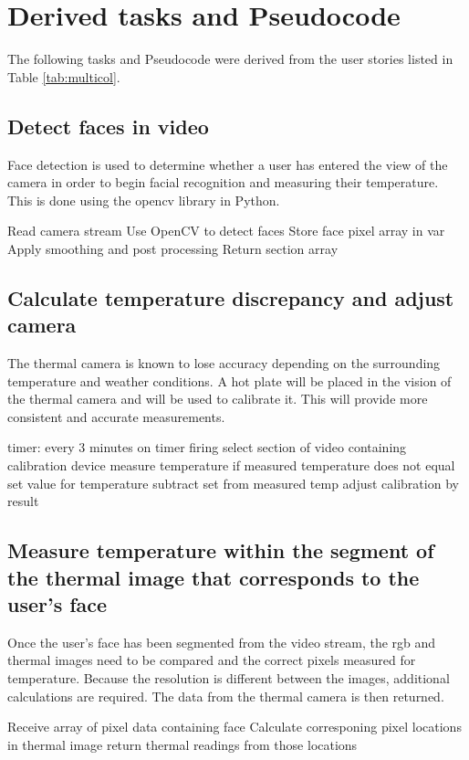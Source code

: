\documentclass[12pt, letterpaper]{article}
\begin{document}
    \section{Derived tasks and Pseudocode}
    The following tasks and Pseudocode were derived from the user stories listed in Table \ref{tab:multicol}.
    \subsection{Detect faces in video}
    Face detection is used to determine whether a user has entered the view of the camera in order to 
    begin facial recognition and measuring their temperature. This is done using the opencv library in 
    Python.
    \begin{algorithm}
        Read camera stream
        Use OpenCV to detect faces
        Store face pixel array in var
        Apply smoothing and post processing
        Return section array
    \end{algorithm}
    \subsection{Calculate temperature discrepancy and adjust camera}
    The thermal camera is known to lose accuracy depending on the surrounding temperature and weather 
    conditions. A hot plate will be placed in the vision of the thermal camera and will be used to 
    calibrate it. This will provide more consistent and accurate measurements.
    \begin{algorithm}[caption={Thermal cam calibration.}, label={alg1}]
        timer: every 3 minutes
        on timer firing
            select section of video containing calibration device
            measure temperature
            if measured temperature does not equal set value for temperature
                subtract set from measured temp
                adjust calibration by result
    \end{algorithm}
    \newpage
    \subsection{Measure temperature within the segment of the thermal image that corresponds to the user’s face}
    Once the user's face has been segmented from the video stream, the rgb and thermal images need to be 
    compared and the correct pixels measured for temperature.  Because the resolution is different between the images,
    additional calculations are required. The data from the thermal camera is then returned.
    \begin{algorithm}[caption={Temperatur reading.}, label={alg1}]
        Receive array of pixel data containing face
        Calculate corresponing pixel locations in thermal image
        return thermal readings from those locations
    \end{algorithm}
\end{document}
